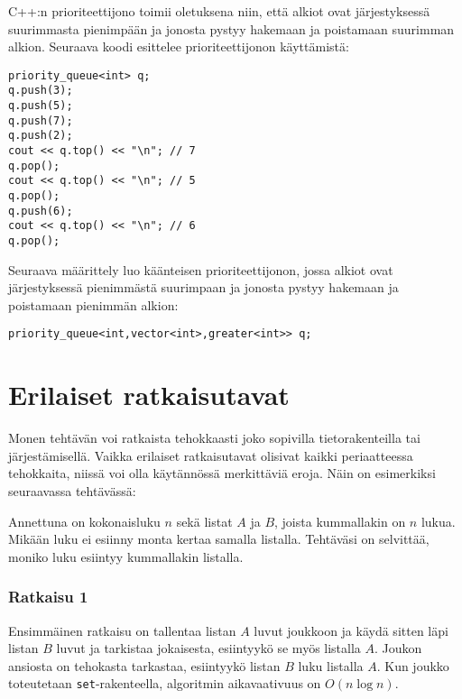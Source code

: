 \begin{samepage}
C++:n prioriteettijono toimii oletuksena niin,
että alkiot ovat järjestyksessä suurimmasta pienimpään
ja jonosta pystyy hakemaan ja poistamaan suurimman alkion.
Seuraava koodi esittelee prioriteettijonon käyttämistä:

\begin{lstlisting}
priority_queue<int> q;
q.push(3);
q.push(5);
q.push(7);
q.push(2);
cout << q.top() << "\n"; // 7
q.pop();
cout << q.top() << "\n"; // 5
q.pop();
q.push(6);
cout << q.top() << "\n"; // 6
q.pop();
\end{lstlisting}
\end{samepage}

Seuraava määrittely luo käänteisen prioriteettijonon,
jossa alkiot ovat järjestyksessä pienimmästä suurimpaan
ja jonosta pystyy hakemaan ja poistamaan pienimmän alkion:

\begin{lstlisting}
priority_queue<int,vector<int>,greater<int>> q;
\end{lstlisting}

\section{Erilaiset ratkaisutavat}

Monen tehtävän voi ratkaista tehokkaasti joko
sopivilla tietorakenteilla tai järjestämisellä.
Vaikka erilaiset ratkaisutavat olisivat kaikki
periaatteessa tehokkaita, niissä voi olla
käytännössä merkittäviä eroja.
Näin on esimerkiksi seuraavassa tehtävässä:

\begin{task}
Annettuna on kokonaisluku $n$ sekä listat $A$ ja $B$,
joista kummallakin on $n$ lukua.
Mikään luku ei esiinny monta kertaa samalla listalla.
Tehtäväsi on selvittää, moniko luku esiintyy
kummallakin listalla.
\end{task}

\subsubsection{Ratkaisu 1}

Ensimmäinen ratkaisu on tallentaa listan $A$ luvut joukkoon
ja käydä sitten läpi listan $B$ luvut ja
tarkistaa jokaisesta, esiintyykö se myös listalla $A$.
Joukon ansiosta on tehokasta tarkastaa,
esiintyykö listan $B$ luku listalla $A$.
Kun joukko toteutetaan \texttt{set}-rakenteella,
algoritmin aikavaativuus on $O(n \log n)$.

